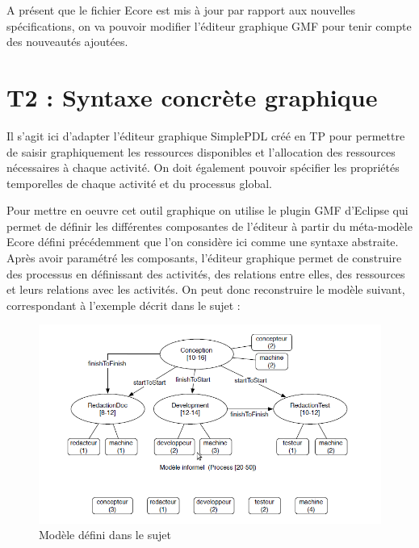 \documentclass{report}
\begin{document}
A présent que le fichier Ecore est mis à jour par rapport aux nouvelles spécifications, on va pouvoir modifier l'éditeur graphique GMF pour tenir compte des nouveautés ajoutées.

\newpage

\section{T2 : Syntaxe concrète graphique}

Il s'agit ici d'adapter l’éditeur graphique SimplePDL créé en TP pour permettre de saisir graphiquement les ressources disponibles et l’allocation des ressources nécessaires à chaque activité. On doit également pouvoir spécifier les propriétés temporelles de chaque activité et du processus global.

Pour mettre en oeuvre cet outil graphique on utilise le plugin GMF d'Eclipse qui permet de définir les différentes composantes de l'éditeur à partir du méta-modèle Ecore défini précédemment que l'on considère ici comme une syntaxe abstraite. Après avoir paramétré les composants, l'éditeur graphique permet de construire des processus en définissant des activités, des relations entre elles, des ressources et leurs relations avec les activités. On peut donc reconstruire le modèle suivant, correspondant à l'exemple décrit dans le sujet :

\begin{figure}[!h] 
\begin{center}
\includegraphics[width=15cm]{Capture-6.png}
\caption{Modèle défini dans le sujet} 
\label{img1} 
\end{center}
\end{figure} 
\end{document}
